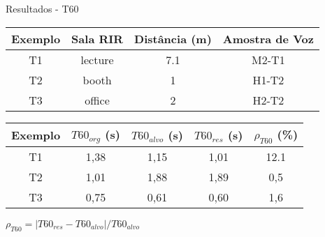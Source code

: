 
\begin{frame}{Resultados - T60}
    \begin{table} [H]
        \centering
        \begin{tabular}{c|c|c|c}
    
            \textbf{Exemplo} & 
            \textbf{Sala RIR} & 
            \textbf{Distância (m)} &
            \textbf{Amostra de Voz} \\
            \hline 
    
            T1 & lecture & 7.1 & M2-T1 \\
            T2 & booth & 1 & H1-T2 \\
            T3 & office & 2 & H2-T2 \\
    
        \end{tabular}
        \bigbreak
        \bigbreak
        \begin{tabular}{c|c|c|c|c}
    
            \textbf{Exemplo} & 
            \textbf{$T60_{org}$ (s)} & 
            \textbf{$T60_{alvo}$ (s)} &
            \textbf{$T60_{res}$ (s)} & 
            \textbf{$\rho_{T60}$ (\%)} \\
            \hline 
    
            T1 & 1,38 & 1,15 & 1,01 & 12.1 \\
            T2 & 1,01 & 1,88 & 1,89 & 0,5 \\
            T3 & 0,75 & 0,61 & 0,60 & 1,6 \\
    
        \end{tabular}
        \vspace{0.5cm}

        $\rho_{T60} = |T60_{res} - T60_{alvo}|/T60_{alvo}$
    \end{table}
\end{frame}

